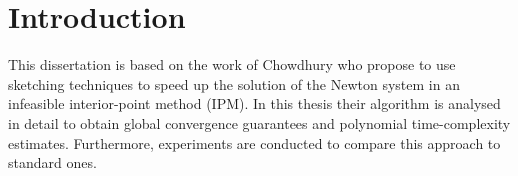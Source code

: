 \chapter{Introduction}

This dissertation is based on the work of Chowdhury \etal{} \cite{Avron-FasterRandomizedInfeasibleIPMs} who propose to use sketching techniques to speed up the solution of the Newton system in an infeasible interior-point method (IPM).
In this thesis their algorithm is analysed in detail to obtain global convergence guarantees and polynomial time-complexity estimates. Furthermore, experiments are conducted to compare this approach to standard ones.
